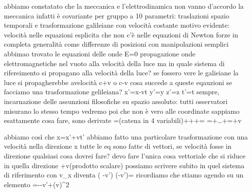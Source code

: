 abbiamo constatato che la meccanica e  l'elettrodinamica non vanno d'accordo
la meccanica infatti è covariante per gruppo a 10 parametri: traslazioni spazio temporali e trasformazione galileiane con velocità costante
motivo evidente: velocità nelle equazioni esplicita che non c'è nelle equazioni di Newton
forze in completa generalità come differenze di posizioni
con manipolazioni semplici abbimao trovato le equazioni delle onde
	\laplacian \vba E=0
propagazione onde elettromagnetiche nel vuoto alla velocità della luce
ma in quale sistema di rifereimento si propagano alla velocità della luce?
se fossero vere le galieiane la luce si propagherebbe avelocità c+v o c-v
cosa succede a queste eqauzioni se facciamo una trasformazione gelileiana?
	x\rightarrowx'=x-vt 
	y\rightarrowy'=y
	z\rightarrow '=z
	t\rightarrowt'=t	sempre, incarnazione delle assunzioni filosofiche su spazio assoluto: tutti osservatori misurano lo stesso tempo
	vedremo poi che non è vero
alle coordinate sappiamo esattamente cosa fare, sono derivate
	=(catena in 4 variabili)+++=
	=+\dots+=+v
	
abbiamo così che
	x=x'+vt'
abbiamo fatto una particolare trasformazione con una velocità nella direzione x
tutte le eq sono fatte di vettori, se velocità fosse in direzione qualsiasi cosa dovrei fare?
devo fare l'unica cosa vettoriale che si riduce in quella direzione
	+\vba v\vdot\grad (prodotto scalare)
possiamo scrivere subito in quel sistema di riferimento con v_x\vdot{}
diventa
	\rightarrow \left( -v\vdot\grad '\right) \left(-\vba v\vdot \grad '\right)=
ricordiamo che stiamo agendo su un elemento
	=--\vba v\vdot\grad '+(v\vdot\grad)^2

